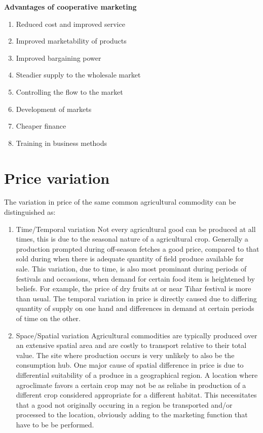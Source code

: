 \documentclass[11pt,]{book}
\providecommand{\tightlist}{%
  \setlength{\itemsep}{0pt}\setlength{\parskip}{0pt}}
\theoremstyle{definition}
\theoremstyle{definition}
\theoremstyle{definition}
\theoremstyle{remark}
\begin{document}
\textbf{Advantages of cooperative marketing}

\begin{enumerate}
\def\labelenumi{\arabic{enumi}.}
\tightlist
\item
  Reduced cost and improved service
\item
  Improved marketability of products
\item
  Improved bargaining power
\item
  Steadier supply to the wholesale market
\item
  Controlling the flow to the market
\item
  Development of markets
\item
  Cheaper finance
\item
  Training in business methods
\end{enumerate}

\section{Price variation}\label{price-variation}

The variation in price of the same common agricultural commodity can be
distinguished as:

\begin{enumerate}
\def\labelenumi{\arabic{enumi}.}
\item
  Time/Temporal variation \newline Not every agricultural good can be
  produced at all times, this is due to the seasonal nature of a
  agricultural crop. Generally a production prompted during off-season
  fetches a good price, compared to that sold during when there is
  adequate quantity of field produce available for sale. This variation,
  due to time, is also most prominant during periods of festivals and
  occassions, when demand for certain food item is heightened by
  beliefs. For example, the price of dry fruits at or near Tihar
  festival is more than usual. The temporal variation in price is
  directly caused due to differing quantity of supply on one hand and
  differences in demand at certain periods of time on the other.
\item
  Space/Spatial variation \newline Agricultural commodities are
  typically produced over an extensive spatial area and are costly to
  transport relative to their total value. The site where production
  occurs is very unlikely to also be the consumption hub. One major
  cause of spatial difference in price is due to differential
  suitability of a produce in a geographical region. A location where
  agroclimate favors a certain crop may not be as reliabe in production
  of a different crop considered appropriate for a different habitat.
  This necessitates that a good not originally occuring in a region be
  transported and/or processed to the location, obviously adding to the
  marketing function that have to be be performed.
\end{enumerate}
\end{document}
